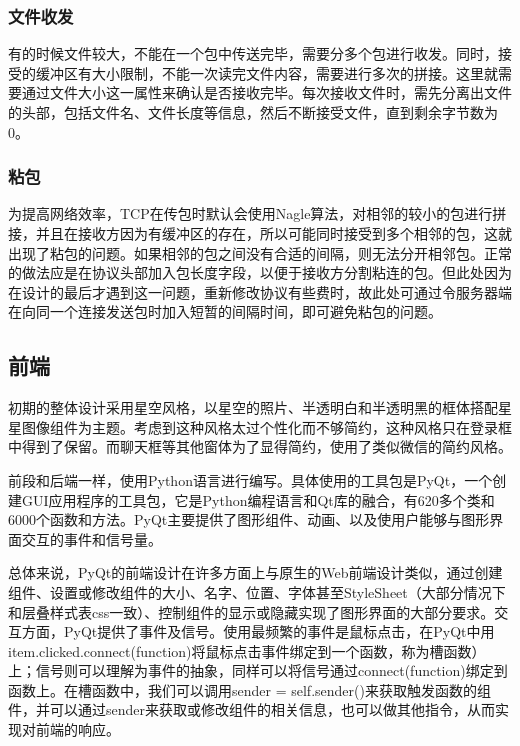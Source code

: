 \documentclass[12pt]{article} %
\begin{document}
\begin{sloppypar}
\subsubsection{文件收发}

有的时候文件较大，不能在一个包中传送完毕，需要分多个包进行收发。同时，接受的缓冲区有大小限制，不能一次读完文件内容，需要进行多次的拼接。这里就需要通过文件大小这一属性来确认是否接收完毕。每次接收文件时，需先分离出文件的头部，包括文件名、文件长度等信息，然后不断接受文件，直到剩余字节数为0。


\subsubsection{粘包}

为提高网络效率，TCP在传包时默认会使用Nagle算法，对相邻的较小的包进行拼接，并且在接收方因为有缓冲区的存在，所以可能同时接受到多个相邻的包，这就出现了粘包的问题。如果相邻的包之间没有合适的间隔，则无法分开相邻包。正常的做法应是在协议头部加入包长度字段，以便于接收方分割粘连的包。但此处因为在设计的最后才遇到这一问题，重新修改协议有些费时，故此处可通过令服务器端在向同一个连接发送包时加入短暂的间隔时间，即可避免粘包的问题。

\subsection{前端}

初期的整体设计采用星空风格，以星空的照片、半透明白和半透明黑的框体搭配星星图像组件为主题。考虑到这种风格太过个性化而不够简约，这种风格只在登录框中得到了保留。而聊天框等其他窗体为了显得简约，使用了类似微信的简约风格。

前段和后端一样，使用Python语言进行编写。具体使用的工具包是PyQt，一个创建GUI应用程序的工具包，它是Python编程语言和Qt库的融合，有620多个类和6000个函数和方法。PyQt主要提供了图形组件、动画、以及使用户能够与图形界面交互的事件和信号量。

总体来说，PyQt的前端设计在许多方面上与原生的Web前端设计类似，通过创建组件、设置或修改组件的大小、名字、位置、字体甚至StyleSheet（大部分情况下和层叠样式表css一致）、控制组件的显示或隐藏实现了图形界面的大部分要求。交互方面，PyQt提供了事件及信号。使用最频繁的事件是鼠标点击，在PyQt中用item.clicked.connect(function)将鼠标点击事件绑定到一个函数，称为槽函数）上；信号则可以理解为事件的抽象，同样可以将信号通过connect(function)绑定到函数上。在槽函数中，我们可以调用sender = self.sender()来获取触发函数的组件，并可以通过sender来获取或修改组件的相关信息，也可以做其他指令，从而实现对前端的响应。


\end{sloppypar}
\end{document}
